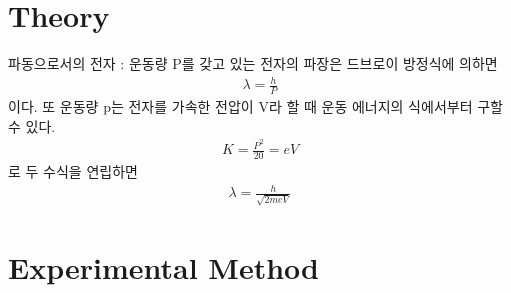 \documentclass[a4paper, 10pt, nanum]{CSUniSchoolLabReport}
\begin{document}

\section{Theory}


	파동으로서의 전자 : 운동량 P를 갖고 있는 전자의 파장은 드브로이 방정식에 의하면
	\begin{align}
		\lambda = \frac{h}{P}
	\end{align}
	이다. 또 운동량 p는 전자를 가속한 전압이 V라 할 때 운동 에너지의 식에서부터 구할 수 있다.
	\begin{align}
		K = \frac{P^2}{20} = eV
	\end{align}
	로 두 수식을 연립하면
	\begin{align}
		\lambda = \frac{h}{\sqrt{2meV}}
	\end{align}


\section{Experimental Method}
\end{document}
